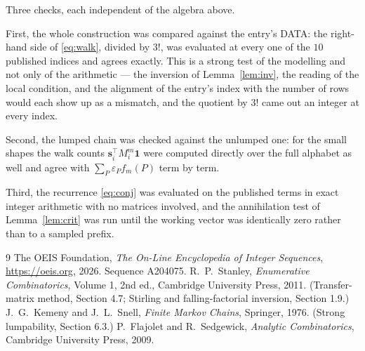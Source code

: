\documentclass[11pt,a4paper]{article}
\theoremstyle{plain}
\theoremstyle{definition}
\begin{document}
Three checks, each independent of the algebra above.

First, the whole construction was compared against the entry's DATA: the right-hand side of
\eqref{eq:walk}, divided by $3!$, was evaluated at every one of the $10$
published indices and agrees exactly. This is a strong test of the modelling and not only of
the arithmetic --- the inversion of Lemma~\ref{lem:inv}, the reading of the local
condition, and the alignment of the entry's index with the number of rows would each
show up as a mismatch, and the quotient by $3!$ came out an integer at every index.

Second, the lumped chain was checked against the unlumped one: for the small shapes the walk
counts $\mathbf{s}_i^{\!\top}M_i^{m}\mathbf{1}$ were computed directly over the full
alphabet as well and agree with $\sum_P\varepsilon_Pf_m(P)$ term by term.

Third, the recurrence \eqref{eq:conj} was evaluated on the published terms in exact integer
arithmetic with no matrices involved, and the annihilation test of Lemma~\ref{lem:crit} was
run until the working vector was identically zero rather than to a sampled prefix.

\begin{thebibliography}{9}
 The OEIS Foundation, \emph{The On-Line Encyclopedia of Integer
Sequences}, \url{https://oeis.org}, 2026. Sequence A204075.
 R.~P.~Stanley, \emph{Enumerative Combinatorics}, Volume 1, 2nd ed.,
Cambridge University Press, 2011. (Transfer-matrix method, Section 4.7; Stirling and
falling-factorial inversion, Section 1.9.)
 J.~G.~Kemeny and J.~L.~Snell, \emph{Finite Markov Chains}, Springer,
1976. (Strong lumpability, Section 6.3.)
 P.~Flajolet and R.~Sedgewick, \emph{Analytic Combinatorics}, Cambridge
University Press, 2009.
\end{thebibliography}
\end{document}

